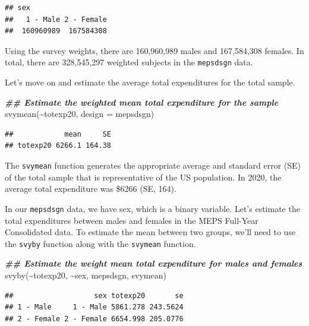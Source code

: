 \documentclass[
]{book}
\newenvironment{Shaded}{\begin{snugshade}}{\end{snugshade}}
\newcommand{\AttributeTok}[1]{\textcolor[rgb]{0.77,0.63,0.00}{#1}}
\newcommand{\DocumentationTok}[1]{\textcolor[rgb]{0.56,0.35,0.01}{\textbf{\textit{#1}}}}
\newcommand{\FunctionTok}[1]{\textcolor[rgb]{0.00,0.00,0.00}{#1}}
\newcommand{\NormalTok}[1]{#1}
\newcommand{\SpecialCharTok}[1]{\textcolor[rgb]{0.00,0.00,0.00}{#1}}
\begin{document}
\begin{verbatim}
## sex
##   1 - Male 2 - Female 
##  160960989  167584308
\end{verbatim}

Using the survey weights, there are 160,960,989 males and 167,584,308 females. In total, there are 328,545,297 weighted subjects in the \texttt{mepsdsgn} data.

Let's move on and estimate the average total expenditures for the total sample.

\begin{Shaded}
\begin{Highlighting}[]
\DocumentationTok{\#\# Estimate the weighted mean total expenditure for the sample}
\FunctionTok{svymean}\NormalTok{(}\SpecialCharTok{\textasciitilde{}}\NormalTok{totexp20, }\AttributeTok{design =}\NormalTok{ mepsdsgn)}
\end{Highlighting}
\end{Shaded}

\begin{verbatim}
##            mean     SE
## totexp20 6266.1 164.38
\end{verbatim}

The \texttt{svymean} function generates the appropriate average and standard error (SE) of the total sample that is representative of the US population. In 2020, the average total expenditure was \$6266 (SE, 164).

In our \texttt{mepsdsgn} data, we have sex, which is a binary variable. Let's estimate the total expenditures between males and females in the MEPS Full-Year Consolidated data. To estimate the mean between two groups, we'll need to use the \texttt{svyby} function along with the \texttt{svymean} function.

\begin{Shaded}
\begin{Highlighting}[]
\DocumentationTok{\#\# Estimate the weight mean total expenditure for males and females}
\FunctionTok{svyby}\NormalTok{(}\SpecialCharTok{\textasciitilde{}}\NormalTok{totexp20, }\SpecialCharTok{\textasciitilde{}}\NormalTok{sex, mepsdsgn, svymean)}
\end{Highlighting}
\end{Shaded}

\begin{verbatim}
##                   sex totexp20       se
## 1 - Male     1 - Male 5861.278 243.5624
## 2 - Female 2 - Female 6654.998 205.0776
\end{verbatim}
\end{document}

